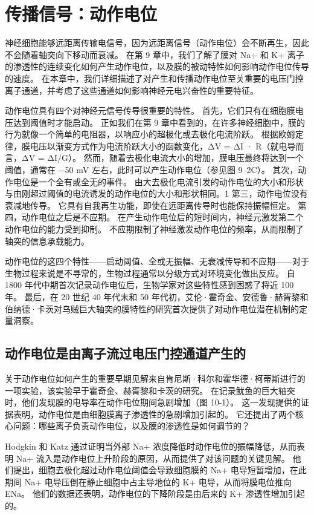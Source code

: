 \chapter{传播信号：动作电位} \label{chap:chap10}
神经细胞能够远距离传输电信号，因为远距离信号（动作电位）会不断再生，因此不会随着轴突向下移动而衰减。 在第 9 章中，我们了解了膜对 Na+ 和 K+ 离子的渗透性的连续变化如何产生动作电位，以及膜的被动特性如何影响动作电位传导的速度。 在本章中，我们详细描述了对产生和传播动作电位至关重要的电压门控离子通道，并考虑了这些通道如何影响神经元电兴奋性的重要特征。

动作电位具有四个对神经元信号传导很重要的特性。 首先，它们只有在细胞膜电压达到阈值时才能启动。 正如我们在第 9 章中看到的，在许多神经细胞中，膜的行为就像一个简单的电阻器，以响应小的超极化或去极化电流阶跃。 根据欧姆定律，膜电压以渐变方式作为电流阶跃大小的函数变化，ΔV = ΔI · R（就电导而言，ΔV = ΔI/G）。 然而，随着去极化电流大小的增加，膜电压最终将达到一个阈值，通常在 −50 mV 左右，此时可以产生动作电位（参见图 9–2C）。 其次，动作电位是一个全有或全无的事件。 由大去极化电流引发的动作电位的大小和形状与由刚超过阈值的电流诱发的动作电位的大小和形状相同。1 第三，动作电位没有衰减地传导。 它具有自我再生功能，即使在远距离传导时也能保持振幅恒定。 第四，动作电位之后是不应期。 在产生动作电位后的短时间内，神经元激发第二个动作电位的能力受到抑制。 不应期限制了神经激发动作电位的频率，从而限制了轴突的信息承载能力。

动作电位的这四个特性——启动阈值、全或无振幅、无衰减传导和不应期——对于生物过程来说是不寻常的，生物过程通常以分级方式对环境变化做出反应。 自 1800 年代中期首次记录动作电位后，生物学家对这些特性感到困惑了将近 100 年。 最后，在 20 世纪 40 年代末和 50 年代初，艾伦·霍奇金、安德鲁·赫胥黎和伯纳德·卡茨对乌贼巨大轴突的膜特性的研究首次提供了对动作电位潜在机制的定量洞察。

\section{动作电位是由离子流过电压门控通道产生的}
关于动作电位如何产生的重要早期见解来自肯尼斯·科尔和霍华德·柯蒂斯进行的一项实验，该实验早于霍奇金、赫胥黎和卡茨的研究。 在记录鱿鱼的巨大轴突时，他们发现膜的电导率在动作电位期间急剧增加（图 10-1）。 这一发现提供的证据表明，动作电位是由细胞膜离子渗透性的急剧增加引起的。 它还提出了两个核心问题：哪些离子负责动作电位，以及膜的渗透性是如何调节的？

Hodgkin 和 Katz 通过证明当外部 Na+ 浓度降低时动作电位的振幅降低，从而表明 Na+ 流入是动作电位上升阶段的原因，从而提供了对该问题的关键见解。 他们提出，细胞去极化超过动作电位阈值会导致细胞膜的 Na+ 电导短暂增加，在此期间 Na+ 电导压倒在静止细胞中占主导地位的 K+ 电导，从而将膜电位推向 ENa。 他们的数据还表明，动作电位的下降阶段是由后来的 K+ 渗透性增加引起的。

